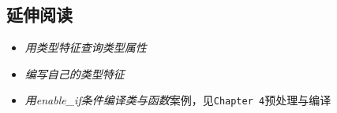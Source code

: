 
\subsection{延伸阅读}



\begin{itemize}
\item \textit{用类型特征查询类型属性}



\item \textit{编写自己的类型特征}



\item \textit{用enable\_if条件编译类与函数}案例，见\texttt{Chapter 4}预处理与编译

\end{itemize}
